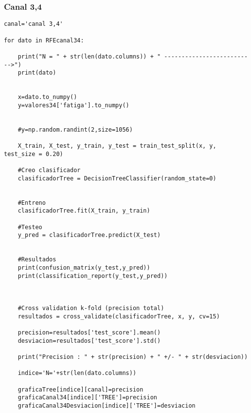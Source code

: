     \subsubsection{{Canal 3,4}}
\begin{lstlisting}
canal='canal 3,4'

for dato in RFEcanal34:
    
    print("N = " + str(len(dato.columns)) + " -------------------------->")
    print(dato)
    
    
    x=dato.to_numpy()
    y=valores34['fatiga'].to_numpy()

    
    #y=np.random.randint(2,size=1056)
    
    X_train, X_test, y_train, y_test = train_test_split(x, y, test_size = 0.20)
    
    #Creo clasificador
    clasificadorTree = DecisionTreeClassifier(random_state=0)


    #Entreno
    clasificadorTree.fit(X_train, y_train)

    #Testeo 
    y_pred = clasificadorTree.predict(X_test)


    #Resultados
    print(confusion_matrix(y_test,y_pred))
    print(classification_report(y_test,y_pred))



    #Cross validation k-fold (precision total)
    resultados = cross_validate(clasificadorTree, x, y, cv=15)
    
    precision=resultados['test_score'].mean()
    desviacion=resultados['test_score'].std()
    
    print("Precision : " + str(precision) + " +/- " + str(desviacion))
    
    indice='N='+str(len(dato.columns))
    
    graficaTree[indice][canal]=precision
    graficaCanal34[indice]['TREE']=precision
    graficaCanal34Desviacion[indice]['TREE']=desviacion
\end{lstlisting}
    
